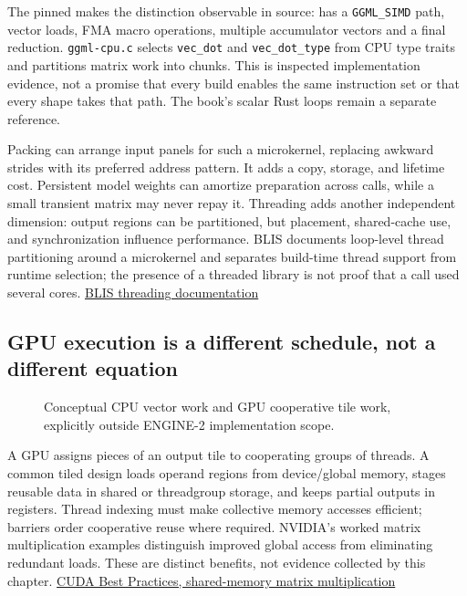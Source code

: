 \documentclass[
  10pt,
]{article}
\begin{document}
The pinned \texttt{} makes the distinction
observable in source: \texttt{} has a
\texttt{GGML\_SIMD} path, vector loads, FMA macro operations, multiple
accumulator vectors and a final reduction. \texttt{ggml-cpu.c} selects
\texttt{vec\_dot} and \texttt{vec\_dot\_type} from CPU type traits and
partitions matrix work into chunks. This is inspected implementation
evidence, not a promise that every build enables the same instruction
set or that every shape takes that path. The book's scalar Rust loops
remain a separate reference.

Packing can arrange input panels for such a microkernel, replacing
awkward strides with its preferred address pattern. It adds a copy,
storage, and lifetime cost. Persistent model weights can amortize
preparation across calls, while a small transient matrix may never repay
it. Threading adds another independent dimension: output regions can be
partitioned, but placement, shared-cache use, and synchronization
influence performance. BLIS documents loop-level thread partitioning
around a microkernel and separates build-time thread support from
runtime selection; the presence of a threaded library is not proof that
a call used several cores.
\href{https://github.com/flame/blis/blob/master/docs/Multithreading.md}{BLIS
threading documentation}

\subsection{GPU execution is a different schedule, not a different
equation}\label{gpu-execution-is-a-different-schedule-not-a-different-equation}

\begin{figure}[H]\centering\resizebox{\linewidth}{!}{}\caption{Conceptual CPU vector work and GPU cooperative tile work, explicitly outside ENGINE-2 implementation scope.}\end{figure}

A GPU assigns pieces of an output tile to cooperating groups of threads.
A common tiled design loads operand regions from device/global memory,
stages reusable data in shared or threadgroup storage, and keeps partial
outputs in registers. Thread indexing must make collective memory
accesses efficient; barriers order cooperative reuse where required.
NVIDIA's worked matrix multiplication examples distinguish improved
global access from eliminating redundant loads. These are distinct
benefits, not evidence collected by this chapter.
\href{https://docs.nvidia.com/cuda/cuda-c-best-practices-guide/index.html\#shared-memory-in-matrix-multiplication-c-ab}{CUDA
Best Practices, shared-memory matrix multiplication}
\end{document}
